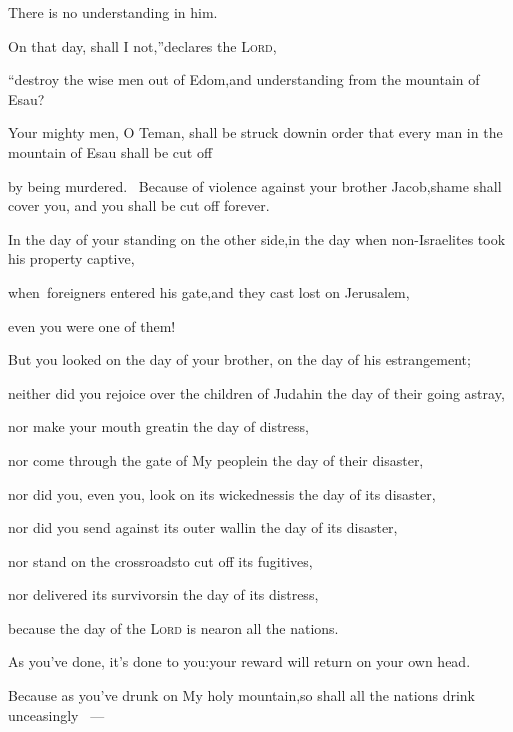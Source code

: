 \begin{inparaenum}
  \pc There is no understanding in him.%
  
  \pa {} On that day, shall I not,''\pa declares the \textsc{Lord},%
  
  \pb ``destroy the wise men out of Edom,\pa and understanding from the mountain of Esau?%
  
  \pa {} Your mighty men, O Teman, shall be struck down\pa in order that every man in the mountain of Esau shall be cut off%
  
  \pb by being murdered.\  Because of violence against your brother Jacob,\pa shame shall cover you, and you shall be cut off forever.%
  
  \pa {} In the day of your standing on the other side,\pa in the day when non-Israelites took his property captive,%
  
  \pb when\understood\ foreigners entered his gate,\pa and they cast lost on Jerusalem,%
  
  \pb even you were one of them!%
  
  \pb {} But you looked on the day of your brother,%
  \pa on the day of his estrangement;%
  
  \pc neither did you rejoice over the children of Judah\pa in the day of their going astray,%
  
  \pc nor make your mouth great\pa in the day of distress,%
  
  \pb {} nor come through the gate of My people\pa in the day of their disaster,%
  
  \pc nor did you, even you, look on its wickedness\pa is the day of its disaster,%
  
  \pc nor did you send against its outer wall\pa in the day of its disaster,%
  
  \pb {} nor stand on the crossroads\pa to cut off its fugitives,%
  
  \pc nor delivered its survivors\pa in the day of its distress,%
  
  \pb {} because the day of the \textsc{Lord} is near\pa on all the nations.%
  
  \pc As you've done, it's done to you:\pa your reward will return on your own head.%
  
  \pa {} Because as you've drunk on My holy mountain,\pa so shall all the nations drink unceasingly%
  ~---%
  

\end{inparaenum}
